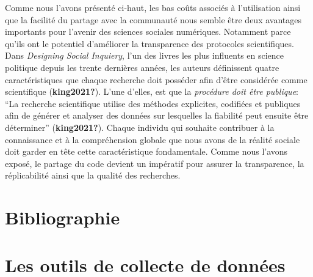 \documentclass[
  letterpaper,
]{scrbook}
\begin{document}
Comme nous l'avons présenté ci-haut, les bas coûts associés à
l'utilisation ainsi que la facilité du partage avec la communauté nous
semble être deux avantages importants pour l'avenir des sciences
sociales numériques. Notamment parce qu'ils ont le potentiel d'améliorer
la transparence des protocoles scientifiques. Dans \emph{Designing
Social Inquiery}, l'un des livres les plus influents en science
politique depuis les trente dernières années, les auteurs définissent
quatre caractéristiques que chaque recherche doit posséder afin d'être
considérée comme scientifique (\textbf{king2021?}). L'une d'elles, est
que la \emph{procédure doit être publique}: ``La recherche scientifique
utilise des méthodes explicites, codifiées et publiques afin de générer
et analyser des données sur lesquelles la fiabilité peut ensuite être
déterminer'' (\textbf{king2021?}). Chaque individu qui souhaite
contribuer à la connaissance et à la compréhension globale que nous
avons de la réalité sociale doit garder en tête cette caractéristique
fondamentale. Comme nous l'avons exposé, le partage du code devient un
impératif pour assurer la transparence, la réplicabilité ainsi que la
qualité des recherches.

\newpage{}


\hypertarget{bibliographie}{%
\chapter{Bibliographie}\label{bibliographie}}


\hypertarget{les-outils-de-collecte-de-donnuxe9es}{%
\chapter{Les outils de collecte de
données}\label{les-outils-de-collecte-de-donnuxe9es}}
\end{document}
